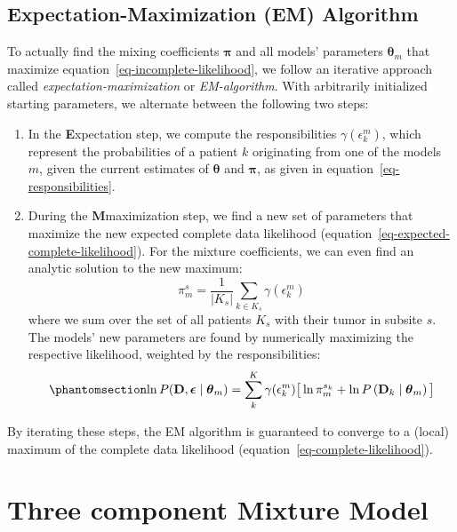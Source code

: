 \documentclass[
  sn-mathphys-num,
]{sn-jnl}
\providecommand{\tightlist}{%
  \setlength{\itemsep}{0pt}\setlength{\parskip}{0pt}}\usepackage{longtable,booktabs,array}
\begin{document}
\subsection{Expectation-Maximization (EM)
Algorithm}\label{expectation-maximization-em-algorithm}

To actually find the mixing coefficients \(\boldsymbol{\pi}\) and all
models' parameters \(\boldsymbol{\theta}_m\) that maximize
equation~\ref{eq-incomplete-likelihood}, we follow an iterative approach
called \emph{expectation-maximization} or \emph{EM-algorithm}. With
arbitrarily initialized starting parameters, we alternate between the
following two steps:

\begin{enumerate}
\def\labelenumi{\arabic{enumi}.}
\tightlist
\item
  In the \textbf{E}xpectation step, we compute the responsibilities
  \(\gamma(\epsilon_k^m)\), which represent the probabilities of a
  patient \(k\) originating from one of the models \(m\), given the
  current estimates of \(\boldsymbol{\theta}\) and \(\boldsymbol{\pi}\),
  as given in equation~\ref{eq-responsibilities}.
\item
  During the \textbf{M}maximization step, we find a new set of
  parameters that maximize the new expected complete data likelihood
  (equation~\ref{eq-expected-complete-likelihood}). For the mixture
  coefficients, we can even find an analytic solution to the new
  maximum: \[
  \pi_m^s = \frac{1}{|K_s|} \sum_{k \in K_s} \gamma(\epsilon_k^m)
  \] where we sum over the set of all patients \(K_s\) with their tumor
  in subsite \(s\).\\
  The models' new parameters are found by numerically maximizing the
  respective likelihood, weighted by the responsibilities:
  \begin{equation}\phantomsection\label{eq-maximization-step}{
  \ln P(\mathbf{D}, \boldsymbol{\epsilon} \mid \boldsymbol{\theta}_m) = \sum_k^K \gamma(\epsilon^m_{k}) \big[ \ln \pi_m^{s_k} + \ln P \left( \mathbf{D}_k \mid \boldsymbol{\theta}_m \right) \big]
  }\end{equation}
\end{enumerate}

By iterating these steps, the EM algorithm is guaranteed to converge to
a (local) maximum of the complete data likelihood
(equation~\ref{eq-complete-likelihood}).

\section{Three component Mixture Model}\label{sec-3comp}
\end{document}
